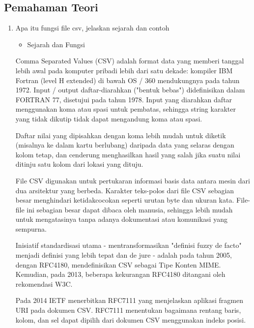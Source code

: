 \subsection{Pemahaman Teori}
\begin{enumerate}
    \item Apa itu fungsi file csv, jelaskan sejarah dan contoh
	
	\begin{itemize}
	\item Sejarah dan Fungsi
	\end{itemize}
	\par Comma Separated Values (CSV) adalah format data yang memberi tanggal lebih awal pada komputer pribadi lebih dari satu dekade: kompiler IBM Fortran (level H extended) di bawah OS / 360 mendukungnya pada tahun 1972. Input / output daftar-diarahkan ("bentuk bebas") didefinisikan dalam FORTRAN 77, disetujui pada tahun 1978. Input yang diarahkan daftar menggunakan koma atau spasi untuk pembatas, sehingga string karakter yang tidak dikutip tidak dapat mengandung koma atau spasi.
	
	\par Daftar nilai yang dipisahkan dengan koma lebih mudah untuk diketik (misalnya ke dalam kartu berlubang) daripada data yang selaras dengan kolom tetap, dan cenderung menghasilkan hasil yang salah jika suatu nilai ditinju satu kolom dari lokasi yang dituju.
	
	\par File CSV digunakan untuk pertukaran informasi basis data antara mesin dari dua arsitektur yang berbeda. Karakter teks-polos dari file CSV sebagian besar menghindari ketidakcocokan seperti urutan byte dan ukuran kata. File-file ini sebagian besar dapat dibaca oleh manusia, sehingga lebih mudah untuk mengatasinya tanpa adanya dokumentasi atau komunikasi yang sempurna.
	
	\par Inisiatif standardisasi utama - mentransformasikan "definisi fuzzy de facto" menjadi definisi yang lebih tepat dan de jure - adalah pada tahun 2005, dengan RFC4180, mendefinisikan CSV sebagai Tipe Konten MIME. Kemudian, pada 2013, beberapa kekurangan RFC4180 ditangani oleh rekomendasi W3C. 
	
	\par Pada 2014 IETF menerbitkan RFC7111 yang menjelaskan aplikasi fragmen URI pada dokumen CSV. RFC7111 menentukan bagaimana rentang baris, kolom, dan sel dapat dipilih dari dokumen CSV menggunakan indeks posisi.


\end{enumerate}
